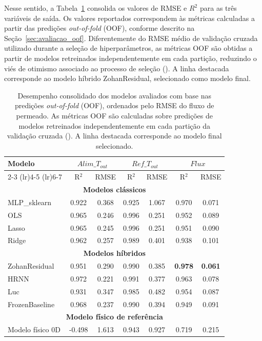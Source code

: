 Nesse sentido, a Tabela~\ref{tab:model_performance_outputs} consolida os valores de RMSE e $R^2$ para as três variáveis de saída. Os valores reportados correspondem às métricas calculadas a partir das predições \textit{out-of-fold} (OOF), conforme descrito na Seção~\ref{sec:avaliacao_oof}. Diferentemente do RMSE médio de validação cruzada utilizado durante a seleção de hiperparâmetros, as métricas OOF são obtidas a partir de modelos retreinados independentemente em cada partição, reduzindo o viés de otimismo associado ao processo de seleção (\cite{Cawley2010Overfitting}). A linha destacada corresponde ao modelo híbrido ZohanResidual, selecionado como modelo final.

\begin{table}[H]
\centering
\caption[Desempenho OOF consolidado dos modelos avaliados]{Desempenho consolidado dos modelos avaliados com base nas predições \textit{out-of-fold} (OOF), ordenados pelo RMSE do fluxo de permeado. As métricas OOF são calculadas sobre predições de modelos retreinados independentemente em cada partição da validação cruzada (\cite{Cawley2010Overfitting}). A linha destacada corresponde ao modelo final selecionado.}
\label{tab:model_performance_outputs}
\begin{tabular}{l c c c c c c}
\toprule
\multirow{2}{*}{Modelo} & \multicolumn{2}{c}{\textbf{$Alim\_T_{out}$}} & \multicolumn{2}{c}{\textbf{$Ref\_T_{out}$}} & \multicolumn{2}{c}{\textbf{$Flux$}} \\
\cmidrule(lr){2-3} \cmidrule(lr){4-5} \cmidrule(lr){6-7}
 & R$^2$ & RMSE & R$^2$ & RMSE & R$^2$ & RMSE \\
\midrule
\multicolumn{7}{c}{\textbf{Modelos clássicos}} \\
\midrule
MLP\_sklearn & 0.922 & 0.368 & 0.925 & 1.067 & 0.970 & 0.071 \\
OLS & 0.965 & 0.246 & 0.996 & 0.251 & 0.952 & 0.089 \\
Lasso & 0.965 & 0.245 & 0.996 & 0.251 & 0.951 & 0.090 \\
Ridge & 0.962 & 0.257 & 0.989 & 0.401 & 0.938 & 0.101 \\
\midrule
\multicolumn{7}{c}{\textbf{Modelos híbridos}} \\
\midrule
\rowcolor{orange!15}
ZohanResidual & 0.951 & 0.290 & 0.990 & 0.385 & \textbf{0.978} & \textbf{0.061} \\
HRNN & 0.972 & 0.221 & 0.991 & 0.377 & 0.963 & 0.078 \\
Luc & 0.931 & 0.347 & 0.985 & 0.482 & 0.954 & 0.087 \\
FrozenBaseline & 0.968 & 0.237 & 0.990 & 0.394 & 0.949 & 0.091 \\
\midrule
\multicolumn{7}{c}{\textbf{Modelo físico de referência}} \\
\midrule
Modelo físico 0D & -0.498 & 1.613 & 0.943 & 0.927 & 0.719 & 0.215 \\
\bottomrule
\end{tabular}
\end{table}

